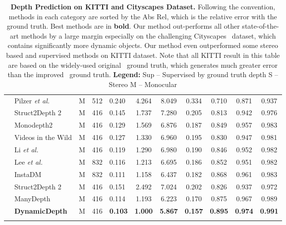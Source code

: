 \documentclass[runningheads]{llncs}
\newcommand{\etal}{\textit{et al.}}
\begin{document}
\begin{center}
\begin{table*}[t]
{\begin{tabular}{|l|l|c|c||a|c|c|c|c|c|c|}
                
\parbox[b]{2mm}{} 
&Pilzer \etal \cite{pilzer2018unsupervised} & M &  512 &0.240 & 4.264 & 8.049 & 0.334 & 0.710 &  0.871 & 0.937 \\
&Struct2Depth 2 \cite{Casser_2019_CVPR_Workshops}  &  M  &   416 &0.145  & 1.737  & 7.280  &  0.205 & 0.813 & 0.942 & 0.976 \\
&Monodepth2 \cite{monodepth2} & M  & 416 &0.129  &   1.569  &   6.876  &   0.187  &   0.849  &   0.957  &   0.983 \\
&Videos in the Wild \cite{gordon2019depth} & M &  416 &{0.127} & {1.330} & {6.960} & {0.195} & {0.830} & {0.947} & {0.981} \\
&Li \etal \cite{li2020unsupervised} & M & 416 &0.119 &  1.290 & {6.980} &  {0.190} & {0.846} &  0.952 &  0.982 \\
& Lee \etal~\cite{lee2021attentive} & M & 832 &0.116 &1.213 &6.695 &0.186 &0.852 &0.951 &0.982\\
& InstaDM~\cite{instadm}  & M     & 832 &0.111 &1.158 &6.437 &0.182 &0.868 &0.961 &0.983 \\
&Struct2Depth 2 \cite{Casser_2019_CVPR_Workshops}  &  M  & 416 &0.151 & 2.492 & 7.024 & 0.202 & 0.826 & 0.937 & 0.972 \\
&ManyDepth~\cite{manydepth} & M  &  416 &0.114  &   1.193  &   6.223  &   0.170  &   0.875  &   0.967  &   0.989 \\
&\textbf{DynamicDepth} & M   & 416 &\textbf{0.103} &\textbf{1.000} &\textbf{5.867} &\textbf{0.157} &\textbf{0.895} &\textbf{0.974} &\textbf{0.991}\\
         
\hline
\end{tabular}
 } 
  \vspace{1mm}
  \caption{ \textbf{Depth Prediction on KITTI and Cityscapes Dataset.} Following the convention, methods in each category are sorted by the Abs Rel, which is the relative error with the ground truth. Best methods are in \textbf{bold}. Our method out-performs all other state-of-the-art methods by a large margin especially on the challenging Cityscapes~\cite{Cityscapes} dataset, which contains significantly more dynamic objects. Our method even outperformed some stereo based and supervised methods on KITTI dataset. Note that all KITTI result in this table are based on the widely-used original~\cite{kitti} ground truth, which generates much greater error than the improved~\cite{kitti2017} ground truth.
  {  \scriptsize
        \newline
        \textbf{Legend:} \hspace{10pt} 
        Sup -- Supervised by ground truth depth\hspace{10pt}
        S -- Stereo\hspace{10pt}
        M -- Monocular
    } }
    \vspace{-5mm}


\end{table*}
\end{center}
\end{document}
